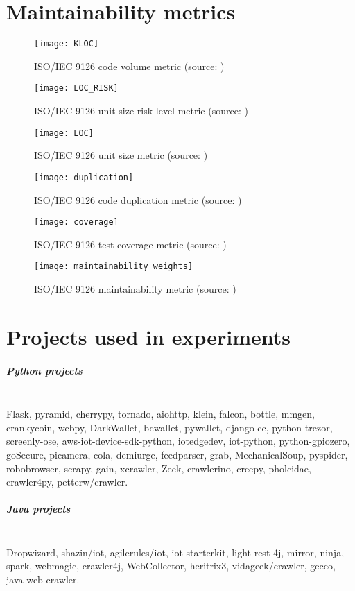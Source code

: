 \documentclass[twoside]{uva-inf-bachelor-thesis}
\newcommand{\myparagraph}[1]{\paragraph{#1}\mbox{}\\}
\begin{document}
\begin{appendices}
\chapter{Maintainability metrics}
\label{appendix:maintainability_metrics}

\begin{figure}[H]
    \caption{ISO/IEC 9126 code volume metric (source: \cite{heitlager2016practical})}
    \centering
        \texttt{[image: KLOC]}
\end{figure}

\begin{figure}[H]
    \caption{ISO/IEC 9126 unit size risk level metric (source: \cite{heitlager2016practical})}
    \centering
        \texttt{[image: LOC\_RISK]}
\end{figure}

\begin{figure}[H]
    \caption{ISO/IEC 9126 unit size metric (source: \cite{heitlager2016practical})}
    \centering
        \texttt{[image: LOC]}
\end{figure}

\begin{figure}[H]
    \caption{ISO/IEC 9126 code duplication metric (source: \cite{heitlager2016practical})}
    \centering
        \texttt{[image: duplication]}
\end{figure}

\begin{figure}[H]
    \caption{ISO/IEC 9126 test coverage metric (source: \cite{heitlager2016practical})}
    \centering
        \texttt{[image: coverage]}
\end{figure}

\begin{figure}[H]
    \label{figure:maintainability_weights}
    \caption{ISO/IEC 9126 maintainability metric (source: \cite{heitlager2016practical})}
    \centering
        \texttt{[image: maintainability\_weights]}
\end{figure}

\chapter{Projects used in experiments}
\label{appendix:projects}
\myparagraph{Python projects}
Flask, pyramid, cherrypy, tornado, aiohttp, klein, falcon, bottle, mmgen, crankycoin, webpy, DarkWallet, bcwallet, pywallet, django-cc, python-trezor, screenly-ose, aws-iot-device-sdk-python, iotedgedev, iot-python, python-gpiozero, goSecure, picamera, cola, demiurge, feedparser, grab, MechanicalSoup, pyspider, robobrowser, scrapy, gain, xcrawler, Zeek, crawlerino, creepy, pholcidae, crawler4py, petterw/crawler.

\myparagraph{Java projects}
Dropwizard, shazin/iot, agilerules/iot, iot-starterkit, light-rest-4j, mirror, ninja, spark, webmagic, crawler4j, WebCollector, heritrix3, vidageek/crawler, gecco, java-web-crawler.

\end{appendices}
\end{document}
